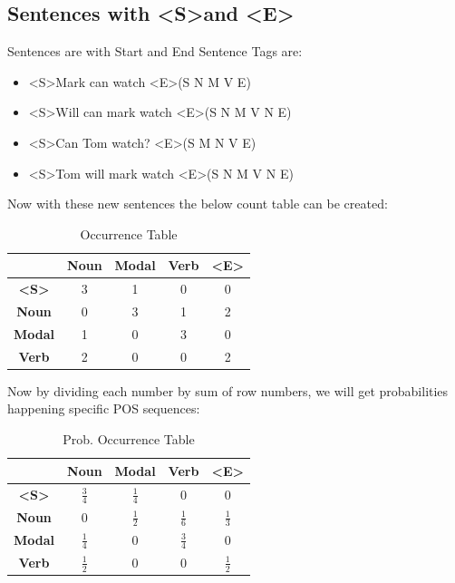 \documentclass{article}
\begin{document}
\pagebreak

\subsection{Sentences with \textless S\textgreater and \textless E\textgreater}
Sentences are with Start and End Sentence Tags are:
\begin{itemize}
  \item \textless S\textgreater Mark can watch \textless E\textgreater (S N M V E)
  \item \textless S\textgreater Will can mark watch \textless E\textgreater (S N M V N E)
  \item \textless S\textgreater Can Tom watch? \textless E\textgreater (S M N V E)
  \item \textless S\textgreater Tom will mark watch \textless E\textgreater (S N M V N E)
\end{itemize}

Now with these new sentences the below count table can be created:
\begin{table}[htbp]
    \centering
    \caption{Occurrence Table}
    \renewcommand{\arraystretch}{1.5}
    \begin{tabular}{|c|c|c|c|c|}
        \hline
        \textbf{} & \textbf{Noun} & \textbf{Modal} & \textbf{Verb} & \textbf{\textless E\textgreater} \\
        \hline
        \textbf{\textless S\textgreater} & 3 & 1 & 0 & 0 \\
        \textbf{Noun} & 0 & 3 & 1 & 2 \\
        \textbf{Modal} & 1 & 0 & 3 & 0 \\
        \textbf{Verb} & 2 & 0 & 0 & 2 \\
        \hline
    \end{tabular}
    \label{tab:occ-table}
\end{table}

Now by dividing each number by sum of row numbers, we will get probabilities happening specific POS sequences:
\begin{table}[htbp]
    \centering
    \caption{Prob. Occurrence Table}
    \renewcommand{\arraystretch}{1.5}
    \begin{tabular}{|c|c|c|c|c|}
        \hline
        \textbf{} & \textbf{Noun} & \textbf{Modal} & \textbf{Verb} & \textbf{\textless E\textgreater} \\
        \hline
        \textbf{\textless S\textgreater} & $\frac{3}{4}$ & $\frac{1}{4}$ & 0 & 0 \\
        \textbf{Noun} & 0 & $\frac{1}{2}$ & $\frac{1}{6}$ & $\frac{1}{3}$ \\
        \textbf{Modal} & $\frac{1}{4}$ & 0 & $\frac{3}{4}$ & 0 \\
        \textbf{Verb} & $\frac{1}{2}$ & 0 & 0 & $\frac{1}{2}$ \\
        \hline
    \end{tabular}
    \label{tab:prob-occ-table}
\end{table}
\end{document}
